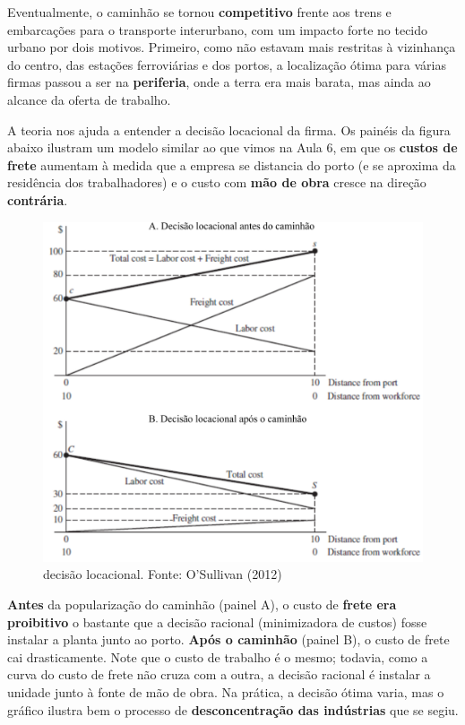 \documentclass[
  12pt,
  a4paper,
]{article}
\begin{document}
Eventualmente, o caminhão se tornou \textbf{competitivo} frente aos
trens e embarcações para o transporte interurbano, com um impacto forte
no tecido urbano por dois motivos. Primeiro, como não estavam mais
restritas à vizinhança do centro, das estações ferroviárias e dos
portos, a localização ótima para várias firmas passou a ser na
\textbf{periferia}, onde a terra era mais barata, mas ainda ao alcance
da oferta de trabalho.

A teoria nos ajuda a entender a decisão locacional da firma. Os painéis
da figura abaixo ilustram um modelo similar ao que vimos na Aula 6, em
que os \textbf{custos de frete} aumentam à medida que a empresa se
distancia do porto (e se aproxima da residência dos trabalhadores) e o
custo com \textbf{mão de obra} cresce na direção \textbf{contrária}.

\begin{figure}

{\centering \includegraphics[width=21.88in]{src/images/caminhao_2} 

}

\caption{\label{fig:caminhao} decisão locacional. Fonte: O'Sullivan (2012)}\label{fig:caminhao}
\end{figure}

\textbf{Antes} da popularização do caminhão (painel A), o custo de
\textbf{frete era proibitivo} o bastante que a decisão racional
(minimizadora de custos) fosse instalar a planta junto ao porto.
\textbf{Após o caminhão} (painel B), o custo de frete cai drasticamente.
Note que o custo de trabalho é o mesmo; todavia, como a curva do custo
de frete não cruza com a outra, a decisão racional é instalar a unidade
junto à fonte de mão de obra. Na prática, a decisão ótima varia, mas o
gráfico ilustra bem o processo de \textbf{desconcentração das
indústrias} que se segiu.
\end{document}

